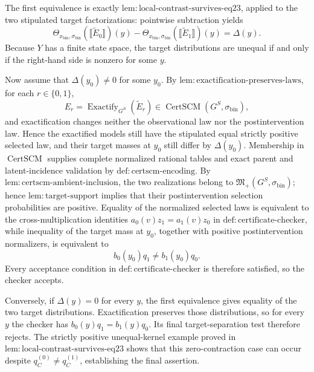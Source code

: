 The first equivalence is exactly \(\mathrm{lem:local\text{-}contrast\text{-}survives\text{-}eq23}\), applied to the two stipulated target factorizations: pointwise subtraction yields
\[
 \Theta_{x_{\mathrm{bin}},\sigma_{\mathrm{bin}}}
   (\llbracket\widetilde E_0\rrbracket)(y)
 -\Theta_{x_{\mathrm{bin}},\sigma_{\mathrm{bin}}}
   (\llbracket\widetilde E_1\rrbracket)(y)
 =\Delta(y).
\]
Because \(Y\) has a finite state space, the target distributions are unequal if and only if the right-hand side is nonzero for some \(y\).

Now assume that \(\Delta(y_0)\ne0\) for some \(y_0\).  By \(\mathrm{lem:exactification\text{-}preserves\text{-}laws}\), for each \(r\in\{0,1\}\),
\[
 E_r=\operatorname{Exactify}_{G^S}(\widetilde E_r)
 \in\operatorname{CertSCM}(G^S,\sigma_{\mathrm{bin}}),
\]
and exactification changes neither the observational law nor the postintervention law.  Hence the exactified models still have the stipulated equal strictly positive selected law, and their target masses at \(y_0\) still differ by \(\Delta(y_0)\).  Membership in \(\operatorname{CertSCM}\) supplies complete normalized rational tables and exact parent and latent-incidence validation by \(\mathrm{def:certscm\text{-}encoding}\).  By \(\mathrm{lem:certscm\text{-}ambient\text{-}inclusion}\), the two realizations belong to \(\mathfrak M_+(G^S,\sigma_{\mathrm{bin}})\); hence \(\mathrm{lem:target\text{-}support}\) implies that their postintervention selection probabilities are positive.  Equality of the normalized selected laws is equivalent to the cross-multiplication identities \(a_0(v)z_1=a_1(v)z_0\) in \(\mathrm{def:certificate\text{-}checker}\), while inequality of the target mass at \(y_0\), together with positive postintervention normalizers, is equivalent to
\[
 b_0(y_0)q_1\ne b_1(y_0)q_0.
\]
Every acceptance condition in \(\mathrm{def:certificate\text{-}checker}\) is therefore satisfied, so the checker accepts.

Conversely, if \(\Delta(y)=0\) for every \(y\), the first equivalence gives equality of the two target distributions.  Exactification preserves those distributions, so for every \(y\) the checker has \(b_0(y)q_1=b_1(y)q_0\).  Its final target-separation test therefore rejects.  The strictly positive unequal-kernel example proved in \(\mathrm{lem:local\text{-}contrast\text{-}survives\text{-}eq23}\) shows that this zero-contraction case can occur despite \(q_C^{(0)}\ne q_C^{(1)}\), establishing the final assertion.